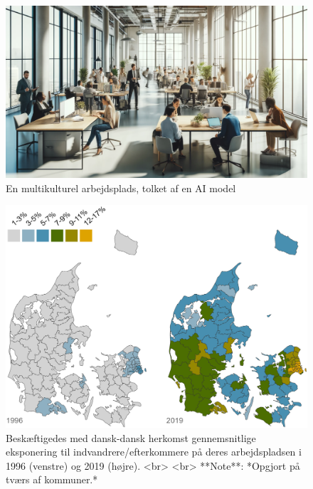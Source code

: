 \documentclass[
]{book}
\begin{document}
\begin{figure}
\includegraphics[width=1\linewidth]{images/dalle-work} \caption{En multikulturel arbejdsplads, tolket af en AI model}\label{fig:fig-work}
\end{figure}

\begin{figure}
\includegraphics[width=1\linewidth]{images/Figur_4_1} \caption{Beskæftigedes med dansk-dansk herkomst gennemsnitlige eksponering til indvandrere/efterkommere på deres arbejdspladsen i 1996 (venstre) og 2019 (højre). <br> <br> **Note**: *Opgjort på tværs af kommuner.*}\label{fig:fig-4-1}
\end{figure}
\end{document}
